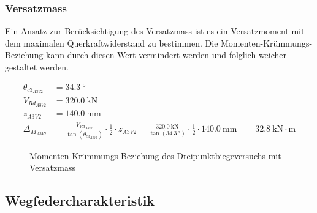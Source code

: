 \documentclass[
  10pt,
  letterpaper,
]{scrreprt}
\begin{document}
\subsubsection{Versatzmass}\label{versatzmass}

Ein Ansatz zur Berücksichtigung des Versatzmass ist es ein Versatzmoment
mit dem maximalen Querkraftwiderstand zu bestimmen. Die
Momenten-Krümmungs-Beziehung kann durch diesen Wert vermindert werden
und folglich weicher gestaltet werden.

$$
\begin{aligned}
\theta_{c3_{A3V2}} &= 34.3\ \mathrm{°} \; 
\\[12pt]
V_{Rd_{A3V2}} &= 320.0\ \mathrm{kN} \; 
\\[12pt]
z_{A3V2} &= 140.0\ \mathrm{mm} \; 
\\[12pt]
\Delta_{M_{A3V2}} &= \frac{ V_{Rd_{A3V2}} }{ \tan \left( \theta_{c3_{A3V2}} \right) } \cdot \frac{1} { 2 } \cdot z_{A3V2}  = \frac{ 320.0\ \mathrm{kN} }{ \tan \left( 34.3\ \mathrm{°} \right) } \cdot \frac{1} { 2 } \cdot 140.0\ \mathrm{mm} &= 32.8\ \mathrm{kN} \cdot \mathrm{m}  
\end{aligned}
$$

\begin{figure}[H]


\caption{\label{fig-mchi_a3v2_versatz}Momenten-Krümmungs-Beziehung des
Dreipunktbiegeversuchs mit Versatzmass}

\end{figure}%

\subsection{Wegfedercharakteristik}\label{wegfedercharakteristik}
\end{document}
